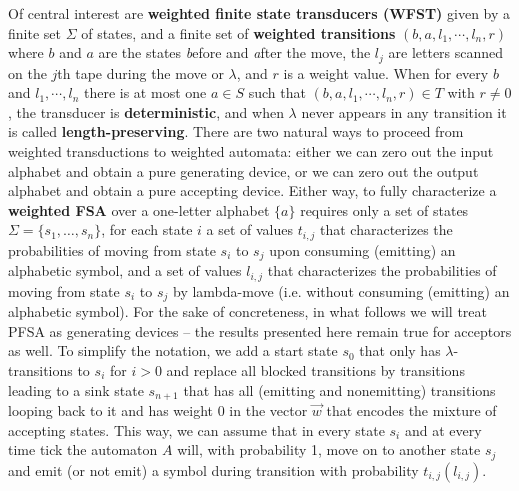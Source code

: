 Of central interest are {\bf weighted finite state transducers (WFST)} given
by a finite set $\Sigma$ of states, and a finite set of {\bf weighted
  transitions}  $(b,a,l_1,\cdots,l_n,r)$ where $b$
and $a$ are the states {\it b}efore and {\it a}fter the move, the $l_j$ are
letters scanned on the $j$th tape during the move or $\lambda$, and $r$ is a
weight value.  When for every $b$ and $l_1,\cdots,l_n$ there is at most one $a
\in S$ such that $(b,a,l_1,\cdots,l_n,r) \in T$ with $r \neq 0$, the
transducer is {\bf deterministic}, and when $\lambda$ never appears in any
transition it is called {\bf length-preserving}.
 There are two natural ways to
proceed from weighted transductions to weighted automata: either we can zero
out the input alphabet and obtain a pure generating device, or we can zero out
the output alphabet and obtain a pure accepting device. Either way, to fully
characterize a {\bf weighted FSA}  over a one-letter alphabet $\{a\}$ requires only a set
of states $\Sigma=\{s_1, \ldots ,s_n\}$, for each state $i$ a set of values
$t_{i,j}$ that characterizes the probabilities of moving from state $s_i$ to
$s_j$ upon consuming (emitting) an alphabetic symbol, and a set of values
$l_{i,j}$ that characterizes the probabilities of moving from state $s_i$ to
$s_j$ by lambda-move (i.e. without consuming (emitting) an alphabetic
symbol). For the sake of concreteness, in what follows we will treat PFSA as
generating devices -- the results presented here remain true for acceptors as
well. To simplify the notation, we add a start state $s_0$ that only has
$\lambda$-transitions to $s_i$ for $i >0$ and replace all blocked transitions
by transitions leading to a sink state $s_{n+1}$ that has all (emitting and
nonemitting) transitions looping back to it and has weight 0 in the vector
$\vec{w}$ that encodes the mixture of accepting states. This way, we can
assume that in every state $s_i$ and at every time tick the automaton $A$
will, with probability 1, move on to another state $s_j$ and emit (or not
emit) a symbol during transition with probability $t_{i,j} (l_{i,j})$.

